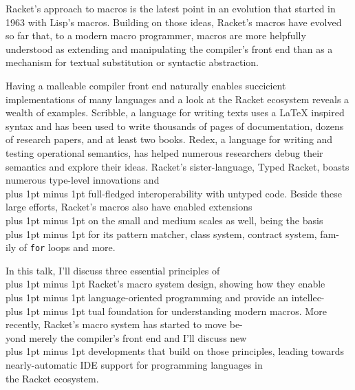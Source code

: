 \documentclass[runningheads]{llncs}
\newcommand{\MoreSpace}{\spaceskip 4pt plus 1pt minus 1pt}
\newcommand{\LittleMoreSpace}{\spaceskip 3pt plus 1pt minus 1pt}
\newcommand{\LessSpace}{\spaceskip 1.5pt plus 1pt minus 1pt}
\begin{document}
Racket's approach to macros is the latest point in an evolution that
started in 1963 with Lisp's macros. Building on those ideas, Racket's
macros have evolved so far that, to a modern macro programmer, macros
are more helpfully understood as extending and manipulating the
compiler's front end than as a mechanism for textual substitution or
syntactic abstraction.

Having a malleable compiler front end naturally enables succicient
implementations of many languages and a look at the Racket ecosystem
reveals a wealth of examples. Scribble, a language for writing texts
uses a \LaTeX{} inspired syntax and has been used to write thousands of
pages of documentation, dozens of research papers, and at least two
books. Redex, a language for writing and testing operational
semantics, has helped numerous researchers debug their semantics and
explore their ideas. Racket's sister-language, Typed Racket, boasts
numerous type-level innovations and\\
%
{\MoreSpace{} full-fledged interoperability with untyped code. Beside these}\\
%
large efforts, Racket's macros also have enabled extensions\\
%
{\LittleMoreSpace{} on the small and medium scales as well, being the basis}\\
%
{\LessSpace{} for its pattern matcher, class system, contract system, fam-} \\
%
ily of \texttt{for} loops and more.

In this talk, I'll discuss three essential principles of\\
%
{\LessSpace{} Racket's macro system design, showing how they enable}\\
%
{\LessSpace{} language-oriented programming and provide an intellec-}\\
%
{\LessSpace{} tual foundation for understanding modern macros. More}\\
%
recently, Racket's macro system has started to move be-\\
%
yond merely the compiler's front end and I'll discuss new\\
%
{\LessSpace{} developments that build on those principles, leading towards}\\
%
nearly-automatic IDE support for programming languages in\\ 
% 
the Racket ecosystem.

\newpage
\end{document}
